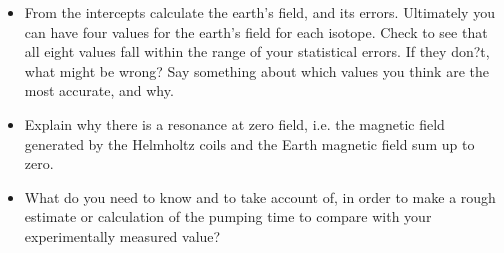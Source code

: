\documentclass[11pt]{article}
\begin{document}
\begin{itemize}
\item From the intercepts calculate the earth's field, and its errors. Ultimately you can have four values for the earth's field for each isotope. Check to see that all eight values fall within the range of your statistical errors. If they don?t, what might be wrong? Say something about which values you think are the most accurate, and why.
\item Explain why there is a resonance at zero field, i.e. the magnetic field generated by the Helmholtz coils and the Earth magnetic field sum up to zero.
\item What do you need to know and to take account of, in order to make a rough estimate or calculation of the pumping time to compare with your experimentally measured value?
\end{itemize}
\end{document}
